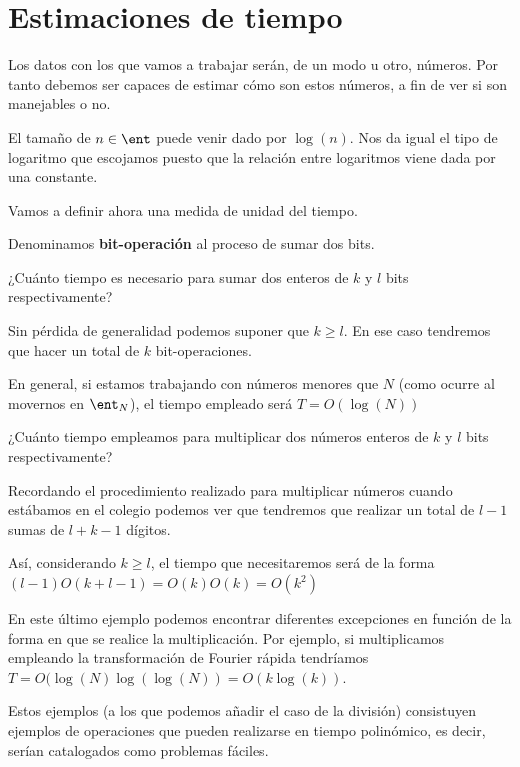 \section{Estimaciones de tiempo}

Los datos con los que vamos a trabajar serán, de un modo u otro, números. Por tanto debemos ser capaces de estimar cómo son estos números, a fin de ver si son manejables o no.

El tamaño de $n \in \ent$ puede venir dado por $\log(n)$. Nos da igual el tipo de logaritmo que escojamos puesto que la relación entre logaritmos viene dada por una constante.

Vamos a definir ahora una medida de unidad del tiempo.

\begin{defn}
Denominamos \textbf{bit-operación} al proceso de sumar dos bits.
\end{defn}

\begin{example}
¿Cuánto tiempo es necesario para sumar dos enteros de $k$ y $l$ bits respectivamente?

Sin pérdida de generalidad podemos suponer que $k\geq l$. En ese caso tendremos que hacer un total de $k$ bit-operaciones.

En general, si estamos trabajando con números menores que $N$ (como ocurre al movernos en $\ent_N$), el tiempo empleado será $T= O (\log(N))$
\end{example}

\begin{example}
¿Cuánto tiempo empleamos para multiplicar dos números enteros de $k$ y $l$ bits respectivamente?

Recordando el procedimiento realizado para multiplicar números cuando estábamos en el colegio podemos ver que tendremos que realizar un total de $l-1$ sumas de $l+k-1$ dígitos.

Así, considerando $k \geq l$, el tiempo que necesitaremos será de la forma $(l-1)O(k+l-1) = O(k)O(k)=O(k^2)$

\end{example}

En este último ejemplo podemos encontrar diferentes excepciones en función de la forma en que se realice la multiplicación. Por ejemplo, si multiplicamos empleando la transformación de Fourier rápida tendríamos $T=O(\log(N) \log(\log(N)) = O(k \log ( k ))$.

Estos ejemplos (a los que podemos añadir el caso de la división) consistuyen ejemplos de operaciones que pueden realizarse en tiempo polinómico, es decir, serían catalogados como problemas fáciles.

